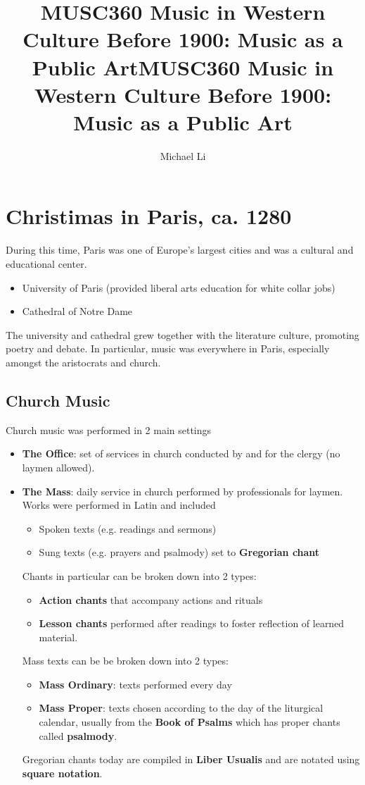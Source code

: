 \documentclass{article}
\date{}
\title{MUSC360 Music in Western Culture Before 1900: Music as a Public Art}
\begin{document}
 
  \author{Michael Li}
  \title{MUSC360 Music in Western Culture Before 1900: Music as a Public Art}
  \maketitle
  \tableofcontents
  \newpage
  \section{Christimas in Paris, ca. 1280}
  During this time, Paris was one of Europe's largest cities and was a cultural and educational center.
  \begin{itemize}
    \item University of Paris (provided liberal arts education for white collar jobs)
    \item Cathedral of Notre Dame
  \end{itemize}
  The university and cathedral grew together with the literature culture, promoting poetry and debate. In particular, music was everywhere in Paris, especially amongst the aristocrats and church.
  \subsection{Church Music}
  Church music was performed in 2 main settings
  \begin{itemize}
    \item \textbf{The Office}: set of services in church conducted by and for the clergy (no laymen allowed).
    \item \textbf{The Mass}: daily service in church performed by professionals for laymen. Works were performed in Latin and included
      \begin{itemize}
        \item Spoken texts (e.g. readings and sermons)
        \item Sung texts (e.g. prayers and psalmody) set to \textbf{Gregorian chant}
      \end{itemize}
      Chants in particular can be broken down into 2 types:
      \begin{itemize}
        \item \textbf{Action chants} that accompany actions and rituals
        \item \textbf{Lesson chants} performed after readings to foster reflection of learned material.
      \end{itemize}
      Mass texts can be be broken down into 2 types:
      \begin{itemize}
        \item \textbf{Mass Ordinary}: texts performed every day
        \item \textbf{Mass Proper}: texts chosen according to the day of the liturgical calendar, usually from the \textbf{Book of Psalms} which has proper chants called \textbf{psalmody}.
      \end{itemize}
      Gregorian chants today are compiled in \textbf{Liber Usualis} and are notated using \textbf{square notation}.
  \end{itemize}
\end{document}
